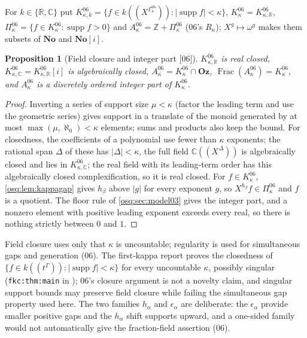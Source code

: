 \documentclass[11pt,letterpaper]{article}
\numberwithin{equation}{section}
\newtheorem{proposition}[proposition]{Proposition}
\theoremstyle{definition}
\theoremstyle{remark}
\theoremstyle{plain}
\newcommand{\No}{\mathbf{No}}
\newcommand{\Oz}{\mathbf{Oz}}
\newcommand{\SC}{\No[i]}
\newcommand{\Z}{\mathbb Z}
\newcommand{\R}{\mathbb R}
\newcommand{\C}{\mathbb C}
\newcommand{\hahn}[2]{#1(\!(X^{#2})\!)}
\newcommand{\supp}{\operatorname{supp}}
\newcommand{\Frac}{\operatorname{Frac}}
\newcommand{\src}[1]{\textup{\textsf{[#1]}}}
\begin{document}
For $k\in\{\R,\C\}$ put $K^{06}_{\kappa,k}=\{f\in\hahn k{\Gamma^{06}_\kappa}:|\supp f|<\kappa\}$,
$K^{06}_\kappa=K^{06}_{\kappa,\R}$, $\Pi^{06}_\kappa=\{f\in K^{06}_\kappa:\supp f>0\}$ and
$A^{06}_\kappa=\Z+\Pi^{06}_\kappa$ (06's $R_\kappa$); $X^g\mapsto\omega^g$ makes them subsets of $\No$
and $\SC$.

\begin{proposition}[Field closure and integer part \src{06}]\label{osq:prop:fieldclosure}
$K^{06}_{\kappa,\R}$ is real closed, $K^{06}_{\kappa,\C}=K^{06}_{\kappa,\R}[i]$ is algebraically
closed, $A^{06}_\kappa=K^{06}_\kappa\cap\Oz$, $\Frac(A^{06}_\kappa)=K^{06}_\kappa$, and $A^{06}_\kappa$
is a discretely ordered integer part of $K^{06}_\kappa$.
\end{proposition}
\begin{proof}
Inverting a series of support size $\mu<\kappa$ (factor the leading term and use the geometric
series) gives support in a translate of the monoid generated by at most $\max(\mu,\aleph_0)<\kappa$
elements; sums and products also keep the bound. For closedness, the coefficients of a polynomial use
fewer than $\kappa$ exponents; the rational span $\Delta$ of these has $|\Delta|<\kappa$, the full field
$\hahn\C\Delta$ is algebraically closed \cite[Corollary~4]{Poonen} and lies in $K^{06}_{\kappa,\C}$; the
real field with its leading-term order has this algebraically closed complexification, so it is real
closed. For $f\in K^{06}_\kappa$, \cref{osq:lem:kappagap} gives $h_\beta$ above $|g|$ for every
exponent $g$, so $X^{h_\beta}f\in\Pi^{06}_\kappa$ and $f$ is a quotient. The floor rule of
\cref{osq:sec:model03} gives the integer part, and a nonzero element with positive leading exponent
exceeds every real, so there is nothing strictly between $0$ and $1$.
\end{proof}

Field closure uses only that $\kappa$ is uncountable; regularity is used for simultaneous gaps and
generation (06). The first-kappa report proves the closedness of $\{f\in k(\!(t^\Gamma)\!):|\supp f|<\kappa\}$
for every uncountable $\kappa$, possibly singular (\nolinkurl{fkc:thm:main} in \cite{RepoFKC}); 06's
closure argument is not a novelty claim, and singular support bounds may preserve field closure while
failing the simultaneous gap property used here. The two families $h_\alpha$ and $\epsilon_\alpha$ are
deliberate: the $\epsilon_\alpha$ provide smaller positive gaps and the $h_\alpha$ shift supports upward,
and a one-sided family would not automatically give the fraction-field assertion (06).
\end{document}
